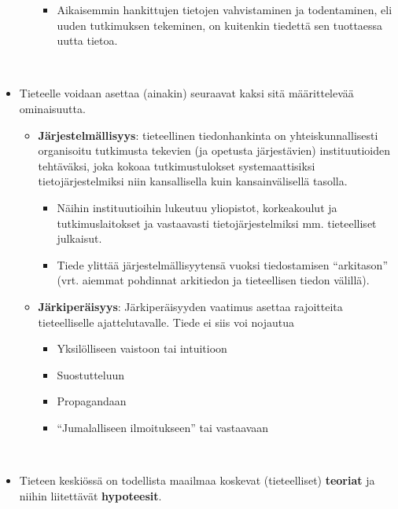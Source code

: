 \documentclass[
]{book}
\providecommand{\tightlist}{%
  \setlength{\itemsep}{0pt}\setlength{\parskip}{0pt}}
\begin{document}
\begin{itemize}
\begin{itemize}
    \begin{itemize}
    \tightlist
    \item
      Aikaisemmin hankittujen tietojen vahvistaminen ja todentaminen, eli uuden tutkimuksen tekeminen, on kuitenkin tiedettä sen tuottaessa uutta tietoa.\\
      \strut \\
    \end{itemize}
  \end{itemize}
\item
  Tieteelle voidaan asettaa (ainakin) seuraavat kaksi sitä määrittelevää ominaisuutta.

  \begin{itemize}
  \tightlist
  \item
    \textbf{Järjestelmällisyys}: tieteellinen tiedonhankinta on yhteiskunnallisesti organisoitu tutkimusta tekevien (ja opetusta järjestävien) instituutioiden tehtäväksi, joka kokoaa tutkimustulokset systemaattisiksi tietojärjestelmiksi niin kansallisella kuin kansainvälisellä tasolla.

    \begin{itemize}
    \tightlist
    \item
      Näihin instituutioihin lukeutuu yliopistot, korkeakoulut ja tutkimuslaitokset ja vastaavasti tietojärjestelmiksi mm. tieteelliset julkaisut.
    \item
      Tiede ylittää järjestelmällisyytensä vuoksi tiedostamisen ``arkitason'' (vrt. aiemmat pohdinnat arkitiedon ja tieteellisen tiedon välillä).
    \end{itemize}
  \item
    \textbf{Järkiperäisyys}: Järkiperäisyyden vaatimus asettaa rajoitteita tieteelliselle ajattelutavalle. Tiede ei siis voi nojautua

    \begin{itemize}
    \tightlist
    \item
      Yksilölliseen vaistoon tai intuitioon
    \item
      Suostutteluun
    \item
      Propagandaan
    \item
      ``Jumalalliseen ilmoitukseen'' tai vastaavaan\\
      \strut \\
    \end{itemize}
  \end{itemize}
\item
  Tieteen keskiössä on todellista maailmaa koskevat (tieteelliset) \textbf{teoriat} ja niihin liitettävät \textbf{hypoteesit}.
\end{itemize}
\end{document}
